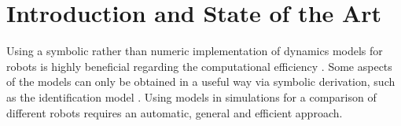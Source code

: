 \documentclass[runningheads]{llncs}
\begin{document}
\section{Introduction and State of the Art}
\label{sec:intro}

Using a symbolic rather than numeric implementation of dynamics models for robots is highly beneficial regarding the computational efficiency \cite{FisettePosSasSam2002}.
Some aspects of the models can only be obtained in a useful way via symbolic derivation, such as the identification model \cite{KhalilDom2002}.
Using models in simulations for a comparison of different robots requires an automatic, general and efficient approach.
\end{document}

